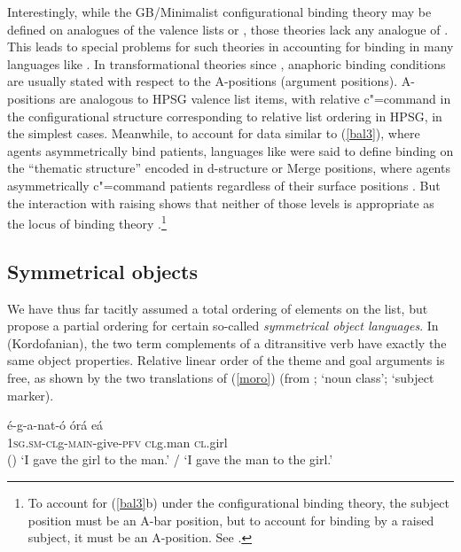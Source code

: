 \documentclass[output=paper
 	        ,biblatex
                ,babelshorthands
                ,newtxmath
                ,draftmode
                ,colorlinks, citecolor=brown
]{langscibook}
\begin{document}
Interestingly, while the GB/Minimalist configurational binding theory may be defined on analogues of
the valence lists or \content, those theories lack any analogue of \argst.  This leads to special problems for
such theories in accounting for binding in many  languages like .
In transformational theories since \citet{Chomsky:1981}, anaphoric binding conditions are usually
stated with respect to the A-positions (argument positions).  A-positions are analogous to HPSG
valence list items, with relative c"=command in the configurational structure corresponding to relative
list ordering in HPSG, in the simplest cases.  Meanwhile, to account for data similar to
(\ref{bal3}), where agents asymmetrically bind patients,  languages like
 were said to define binding on the ``thematic structure'' encoded in d-structure or
Merge positions, where agents asymmetrically c"=command patients regardless of their surface
positions \citep{Guilfoyle+etal:1992}.  But the interaction with raising shows that neither of those
levels is appropriate as the locus of binding theory \citep{Wechsler1999}.\footnote{To account for
  (\ref{bal3}b) under the configurational binding theory, the subject position must be an A-bar
  position, but to account for binding by a raised subject, it must be an A-position.  See
  \citet{Wechsler1999}. }
%

\subsection{Symmetrical objects}

We have thus far tacitly assumed a total ordering of elements on the \argst list, but
\citet*{AMM2013a,Ackermanetal2017} propose a partial ordering for certain so-called \emph{symmetrical object languages}.  In  (Kordofanian), the
two term complements of a ditransitive verb have exactly the same object
properties.  Relative linear order of the theme and goal arguments is free, as shown by the two
translations of (\ref{moro}) (from \citealt[9]{Ackermanetal2017};  `noun class'; 
`subject marker).


\begin{exe}
	\ex\label{moro}
\gll   \'{e}-g-a-nat-\'{o} \'{o}r\'{a}  e\'{a}  \\
        1\textsc{sg.sm-cl}g-\textsc{main}-give-\textsc{pfv}    \textsc{cl}g.man \textsc{cl}.girl \\\hfill()
\glt `I gave the girl to the man.’ / `I gave the man to the girl.’
\end{exe} 
\end{document}
